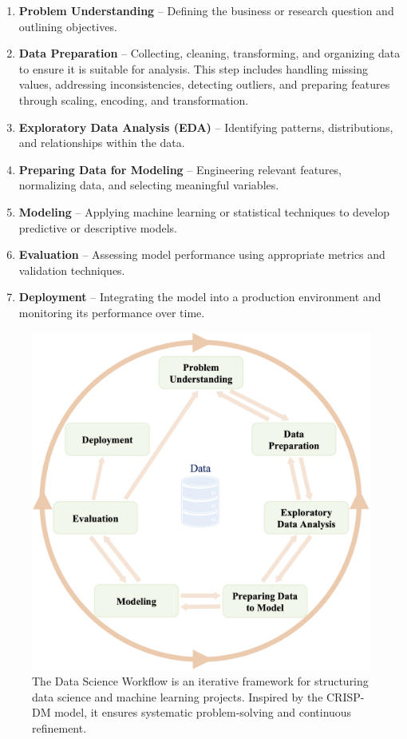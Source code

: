 \documentclass[
]{book}
\providecommand{\tightlist}{%
  \setlength{\itemsep}{0pt}\setlength{\parskip}{0pt}}
\theoremstyle{definition}
\theoremstyle{definition}
\theoremstyle{definition}
\theoremstyle{definition}
\theoremstyle{remark}
\begin{document}
\begin{enumerate}
\def\labelenumi{\arabic{enumi}.}
\tightlist
\item
  \textbf{Problem Understanding} -- Defining the business or research question and outlining objectives.\\
\item
  \textbf{Data Preparation} -- Collecting, cleaning, transforming, and organizing data to ensure it is suitable for analysis. This step includes handling missing values, addressing inconsistencies, detecting outliers, and preparing features through scaling, encoding, and transformation.\\
\item
  \textbf{Exploratory Data Analysis (EDA)} -- Identifying patterns, distributions, and relationships within the data.\\
\item
  \textbf{Preparing Data for Modeling} -- Engineering relevant features, normalizing data, and selecting meaningful variables.\\
\item
  \textbf{Modeling} -- Applying machine learning or statistical techniques to develop predictive or descriptive models.\\
\item
  \textbf{Evaluation} -- Assessing model performance using appropriate metrics and validation techniques.\\
\item
  \textbf{Deployment} -- Integrating the model into a production environment and monitoring its performance over time.
\end{enumerate}

\begin{figure}

{\centering \includegraphics[width=0.7\linewidth]{images/ch2_DSW} 

}

\caption{The Data Science Workflow is an iterative framework for structuring data science and machine learning projects. Inspired by the CRISP-DM model, it ensures systematic problem-solving and continuous refinement.}\label{fig:CRISP-DM}
\end{figure}
\end{document}

